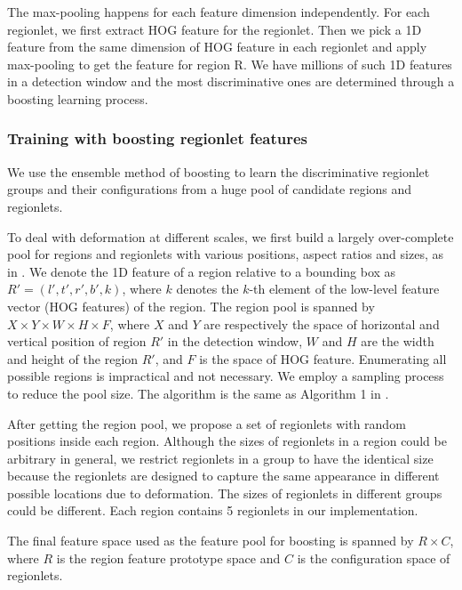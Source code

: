 \documentclass{article} %
\begin{document}
The max-pooling happens for each feature dimension independently. For each regionlet, we first extract HOG feature for the regionlet. Then we pick a 1D feature from the same dimension of HOG feature in each regionlet and apply max-pooling to get the feature for region R. We have millions of such 1D features in a detection window and the most discriminative ones are determined through a boosting learning process.

\subsubsection{Training with boosting regionlet features}
\label{training_regionlets}

We use the ensemble method of boosting to learn the discriminative regionlet groups and their configurations from a huge pool of candidate regions and regionlets.

To deal with deformation at different scales, we first build a largely over-complete pool for regions and regionlets with various positions, aspect ratios and sizes, as in \cite{Wang2013}. 
We denote the 1D feature of a region relative to a bounding box as $R'= (l', t', r', b', k)$, where $k$ denotes the $k$-th element of the low-level feature vector (HOG features) of the region. The region pool is spanned by $X \times Y \times W \times H \times F$, where $X$ and $Y$ are respectively the space of horizontal and vertical position of region $R'$ in the detection window, $W$ and $H$ are the width and height of the region $R'$, and $F$ is the space of HOG feature. Enumerating all possible regions is impractical and not necessary. We employ a sampling process to reduce the pool size. The algorithm is the same as Algorithm 1 in \cite{Wang2013}.

After getting the region pool, we propose a set of regionlets with random positions inside each region. Although the sizes of regionlets in a region could be arbitrary in general, we restrict regionlets in a group to have the identical size because the regionlets are designed to capture the same appearance in different possible locations due to deformation\cite{Wang2013}. The sizes of regionlets in different groups could be different. Each region contains 5 regionlets in our implementation.

The final feature space used as the feature pool for boosting is spanned by $R \times C$, where $R$ is the region feature prototype space and $C$ is the configuration space of regionlets.
\end{document}
